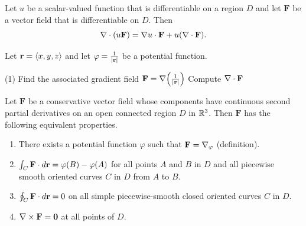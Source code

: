 \documentclass[../mathNotesPreamble]{subfiles}
\begin{document}
  \begin{thmBox*}
    Let $u$ be a scalar-valued function that is differentiable on a region $D$ and let $\mathbf F$ be a vector field that is differentiable on $D$. Then
      \[\nabla\cdot{\left(u\mathbf F\right)}=\nabla u\cdot\mathbf F+u{\left(\nabla\cdot\mathbf F\right)}.\]
  \end{thmBox*}
  \begin{ex*}
    Let ${\mathbf{r}}={\left\langle x,y,z \right\rangle}$ and let $\varphi=\frac{1}{{\left\vert{\mathbf{r}}\right\vert}}$ be a potential function.
  \end{ex*}
  \begin{tasks}[after-item-skip=\stretch{1}, label=](1)
    \task 
      Find the associated gradient field $\mathbf F=\nabla{\left(\frac{1}{{\left\vert{\mathbf{r}}\right\vert}}\right)}$
    \task 
      Compute $\nabla\cdot\mathbf F$
  \end{tasks}
  \pagebreak

  \begin{thmBox*}
    Let $\mathbf F$ be a conservative vector field whose components have continuous second partial derivatives on an open connected region $D$ in $\mathbb{R}^3$. Then $\mathbf F$ has the following equivalent properties.
    \begin{enumerate}
      \item 
        There exists a potential function $\varphi$ such that $\mathbf F=\nabla_\varphi$ (definition).
      \item 
        $\int_C \mathbf F\cdot d{\mathbf{r}}=\varphi(B)-\varphi(A)$ for all points $A$ and $B$ in $D$ and all piecewise smooth oriented curves $C$ in $D$ from $A$ to $B$.
      \item 
        $\oint_C \mathbf F\cdot d{\mathbf{r}}=0$ on all simple piecewise-smooth closed oriented curves $C$ in $D$.
      \item 
        $\nabla\times\mathbf F=\mathbf{0}$ at all points of $D$.
    \end{enumerate}
  \end{thmBox*}

  \pagebreak
  
\end{document}
